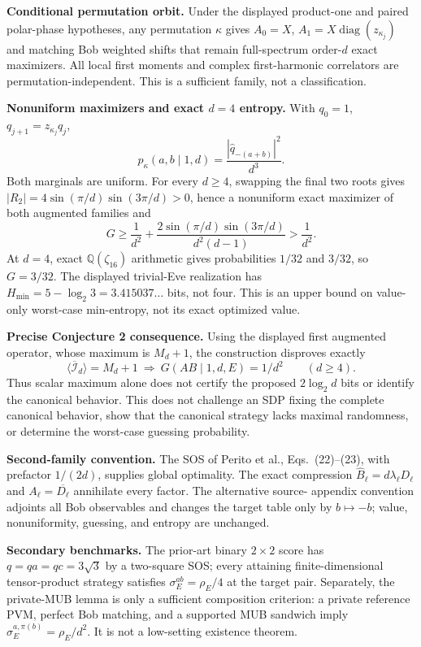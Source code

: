 \documentclass[11pt]{article}
\begin{document}
\textbf{Conditional permutation orbit.}
Under the displayed product-one and paired polar-phase hypotheses, any
permutation $\kappa$ gives
$A_0=X$, $A_1=X\operatorname{diag}(z_{\kappa_j})$ and matching Bob weighted
shifts that remain full-spectrum order-$d$ exact maximizers. All local first
moments and complex first-harmonic correlators are permutation-independent.
This is a sufficient family, not a classification.

\newpage
\textbf{Nonuniform maximizers and exact $d=4$ entropy.}
With $q_0=1$, $q_{j+1}=z_{\kappa_j}q_j$,
\[
 p_\kappa(a,b\mid1,d)=\frac{|\widehat q_{-(a+b)}|^2}{d^3}.
\]
Both marginals are uniform. For every $d\ge4$, swapping the final two roots
gives $|R_2|=4\sin(\pi/d)\sin(3\pi/d)>0$, hence a nonuniform exact maximizer
of both augmented families and
\[
 G\ge\frac1{d^2}+\frac{2\sin(\pi/d)\sin(3\pi/d)}{d^2(d-1)}>\frac1{d^2}.
\]
At $d=4$, exact $\mathbb Q(\zeta_{16})$ arithmetic gives probabilities
$1/32$ and $3/32$, so $G=3/32$. The displayed trivial-Eve realization has
$H_{\min}=5-\log_2 3=3.415037\ldots$ bits, not four. This is an upper bound
on value-only worst-case min-entropy, not its exact optimized value.

\textbf{Precise Conjecture 2 consequence.}
Using the displayed first augmented operator, whose maximum is $M_d+1$, the
construction disproves exactly
\[
 \langle\overline{\mathcal I}_d\rangle=M_d+1
 \ \Longrightarrow\ G(AB\mid1,d,E)=1/d^2
 \qquad(d\ge4).
\]
Thus scalar maximum alone does not certify the proposed $2\log_2d$ bits or
identify the canonical behavior. This does not challenge an SDP fixing the
complete canonical behavior, show that the canonical strategy lacks maximal
randomness, or determine the worst-case guessing probability.

\textbf{Second-family convention.}
The SOS of Perito et al., Eqs.~(22)--(23), with prefactor $1/(2d)$, supplies
global optimality.
The exact compression $\widehat B_\ell=d\lambda_\ell D_\ell$ and
$A_\ell=\overline{D_\ell}$ annihilate every factor. The alternative source-
appendix convention adjoints all Bob observables and changes the target table
only by $b\mapsto-b$; value, nonuniformity, guessing, and entropy are unchanged.

\textbf{Secondary benchmarks.}
The prior-art binary $2\times2$ score has $q=qa=qc=3\sqrt3$ by a two-square
SOS; every attaining finite-dimensional tensor-product strategy satisfies
$\sigma_E^{ab}=\rho_E/4$ at the target pair. Separately, the private-MUB lemma
is only a sufficient composition criterion: a private reference PVM, perfect
Bob matching, and a supported MUB sandwich imply
$\sigma_E^{a,\pi(b)}=\rho_E/d^2$. It is not a low-setting existence theorem.
\end{document}
